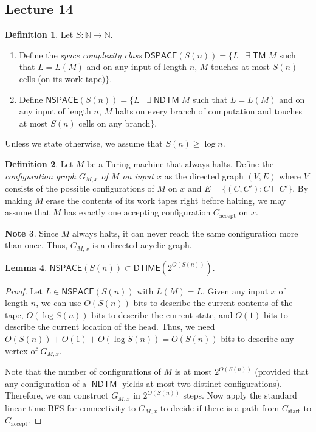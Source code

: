 \documentclass[10pt,letterpaper,cm]{nupset}
\theoremstyle{definition}
\newtheorem{definition}{Definition}[subsection]
\newtheorem{note}[definition]{Note}
\theoremstyle{theorem}
\newtheorem{lemma}[definition]{Lemma}
\theoremstyle{remark}
\newcommand{\N}{\mathbb N}
\newcommand{\1}{\mathbf{1}}
\newcommand{\0}{\vec 0}
\DeclareMathOperator{\TM}{\mathsf{TM}}
\DeclareMathOperator{\NDTM}{\mathsf{NDTM}}
\begin{document}
\subsection{Lecture 14}

\begin{definition} Let $S: \N \to \N$.
\begin{enumerate}
\item Define the \textit{space complexity class} $\mathsf{DSPACE}(S(n)) = \{L \mid \exists \TM M$ such that $L = L(M)$ and on any input of length $n$, $M$ touches at most $S(n)$ cells (on its work tape)$\}$.
\item Define $\mathsf{NSPACE}(S(n)) = \{L \mid \exists \NDTM M$ such that $L = L(M)$ and on any input of length $n$, $M$ halts on every branch of computation and touches at most $S(n)$ cells on any branch$\}$.
\end{enumerate}
Unless we state otherwise, we assume that $S(n) \geq \log{n}$.
\end{definition}

\begin{definition}
Let $M$ be a Turing machine that always halts. Define the \textit{configuration graph $G_{M,x}$ of $M$ on input $x$} as the directed graph $(V, E)$ where $V$ consists of the possible configurations of $M$ on $x$ and $E = \{(C,C') : C \vdash C'\}$. By making $M$ erase the contents of its work tapes right before halting, we may assume that $M$ has exactly one accepting configuration $C_{\text{accept}}$ on $x$.
\end{definition}

\begin{note}
Since $M$ always halts, it can never reach the same configuration more than once. Thus, $G_{M,x}$ is a directed acyclic graph.  
\end{note}

\begin{lemma}
$\mathsf{NSPACE}(S(n)) \subset \mathsf{DTIME}(2^{O(S(n))})$.
\end{lemma}
\begin{proof}
Let $L \in \mathsf{NSPACE}(S(n)) $ with $L(M) = L$.  Given any input $x$ of length $n$, we can use $O(S(n))$ bits to describe the current contents of the tape, $O(\log{S(n)})$ bits to describe the current state, and $O(1)$ bits to describe the current location of the head. Thus, we need $O(S(n)) + O(1) + O(\log{S(n)})= O(S(n))$ bits to describe any vertex of $G_{M,x}$. 

\medskip


Note that the number of configurations of $M$ is at most $2^{O(S(n))}$ (provided that any configuration of a $\NDTM$ yields at most two distinct configurations).  Therefore, we can construct $G_{M,x}$ in $2^{O(S(n))}$ steps. Now apply the standard linear-time BFS for connectivity to $G_{M,x}$ to decide if there is a path from $C_{\text{start}}$ to $C_{\text{accept}}$. 
\end{proof}
\end{document}
